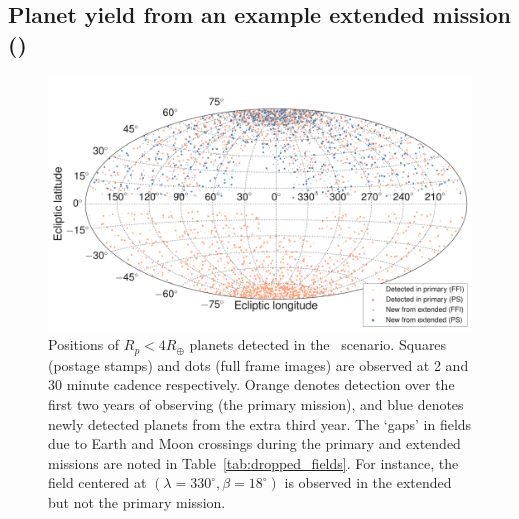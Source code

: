 \subsection{Planet yield from an example extended mission (\rm{\nhemi}) }
\label{sec:results_from_nhemi_extended_mission}

\begin{figure}[t]
	\centering
	\includegraphics[]{figures/skymap_dropped_fields.pdf}
	\caption{Positions of $R_p<4R_\oplus$ planets detected in the \nhemi\ scenario. Squares (postage stamps) and dots (full frame images) are observed at 2 and 30 minute cadence respectively. Orange denotes detection over the first two years of observing (the primary mission), and blue denotes newly detected planets from the extra third year. The `gaps' in fields due to Earth and Moon crossings during the primary and extended missions are noted in Table~\protect\ref{tab:dropped_fields}. For instance, the field centered at $(\lambda=330^\circ,\beta=18^\circ)$ is observed in the extended but not the primary mission. }
	\label{fig:skymap_nhemi}
\end{figure}
